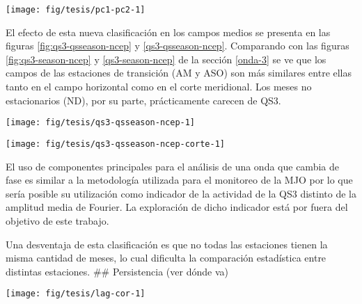 \documentclass[spanish,a4paper,12p]{book}
\begin{document}
\begin{figure*}
\texttt{[image: fig/tesis/pc1-pc2-1]} \caption{Valor medio de las dos primeras componentes principales del campo de QS3}\label{fig:pc1-pc2}
\end{figure*}

El efecto de esta nueva clasificación en los campos medios se presenta
en las figuras \ref{fig:qs3-qsseason-ncep} y \ref{qs3-qsseason-ncep}.
Comparando con las figuras \ref{fig:qs3-season-ncep} y
\ref{qs3-season-ncep} de la sección \ref{onda-3} se ve que los campos de
las estaciones de transición (AM y ASO) son más similares entre ellas
tanto en el campo horizontal como en el corte meridional. Los meses no
estacionarios (ND), por su parte, prácticamente carecen de QS3.

\begin{figure*}
\texttt{[image: fig/tesis/qs3-qsseason-ncep-1]} \caption{Media de reconstrucción de onda 3 en 300hPa - fig:qs3-qsseason-ncep}\label{fig:qs3-qsseason-ncep}
\end{figure*}

\begin{figure*}
\texttt{[image: fig/tesis/qs3-qsseason-ncep-corte-1]} \caption{Corte - fig:qs3-qsseason-ncep-corte}\label{fig:qs3-qsseason-ncep-corte}
\end{figure*}

El uso de componentes principales para el análisis de una onda que
cambia de fase es similar a la metodología utilizada para el monitoreo
de la MJO por lo que sería posible su utilización como
indicador de la actividad de la QS3 distinto de la amplitud media de
Fourier. La exploración de dicho indicador está por fuera del objetivo
de este trabajo.

Una desventaja de esta clasificación es que no todas las estaciones
tienen la misma cantidad de meses, lo cual dificulta la comparación
estadística entre distintas estaciones. \#\# Persistencia (ver dónde va)

\begin{figure*}
\texttt{[image: fig/tesis/lag-cor-1]} \caption{Correlación lageada para cada mes con los 12 sigientes. - fig:lag-cor}\label{fig:lag-cor}
\end{figure*}
\end{document}

